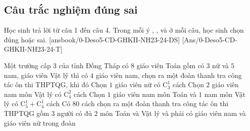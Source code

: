 \subsection{Câu trắc nghiệm đúng sai}
Học sinh trả lời từ câu 1 đến câu 4.
Trong mỗi ý , ,  và  ở mỗi câu, học sinh chọn đúng hoặc sai.
\setcounter{ex}{0}
\LGexTF
{}[ansbook/0-Deso5-CD-GHKII-NH23-24-DS]
[Ans/0-Deso5-CD-GHKII-NH23-24-T]
\begin{ex}%
	Một trường cấp $3$ của tỉnh Đồng Tháp có $8$ giáo viên Toán gồm có $3$ nữ và $5$ nam, giáo viên Vật lý thì có $4$ giáo viên nam, chọn ra một đoàn thanh tra công tác ôn thi THPTQG, khi đó
	\choiceTF
	{\True Chọn $1$ giáo viên nữ có $\mathrm{C}_3^1$ cách}
	{\True Chọn $2$ giáo viên nam môn Vật lý có $\mathrm{C}_4^2$ cách}
	{Chọn $1$ giáo viên nam môn Toán và $1$ nam môn Vật lý có $\mathrm{C}_5^1+\mathrm{C}_4^1$ cách}
	{Có $80$ cách chọn ra một đoàn thanh tra công tác ôn thi THPTQG gồm $3$ người có đủ $2$ môn Toán và Vật lý và phải có giáo viên nam và giáo viên nữ trong đoàn} 
\end{ex}
